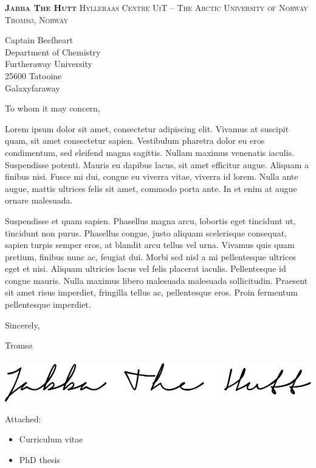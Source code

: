 \documentclass[11pt,a4paper,]{article}
\begin{document}
\footnotesize
\textsc{\textbf{Jabba The Hutt}}
\textbullet{} \textsc{Hylleraas Centre}
\textbullet{} \textsc{UiT -- The Arctic University of Norway}
\textbullet{} \textsc{Tromsø, Norway}

\vspace{5em}

\normalsize \sffamily
Captain Beefheart\\
Department of Chemistry\\
Furtheraway University\\
25600 Tatooine\\
Galaxyfaraway\\

\vspace{2em}

\rmfamily


\vspace{1em}

To whom it may concern,

Lorem ipsum dolor sit amet, consectetur adipiscing elit. Vivamus at
suscipit quam, sit amet consectetur sapien. Vestibulum pharetra dolor eu
eros condimentum, sed eleifend magna sagittis. Nullam maximus venenatis
iaculis. Suspendisse potenti. Mauris eu dapibus lacus, sit amet
efficitur augue. Aliquam a finibus nisi. Fusce mi dui, congue eu viverra
vitae, viverra id lorem. Nulla ante augue, mattis ultrices felis sit
amet, commodo porta ante. In et enim at augue ornare malesuada.

Suspendisse et quam sapien. Phasellus magna arcu, lobortis eget
tincidunt ut, tincidunt non purus. Phasellus congue, justo aliquam
scelerisque consequat, sapien turpis semper eros, at blandit arcu tellus
vel urna. Vivamus quis quam pretium, finibus nunc ac, feugiat dui. Morbi
sed nisl a mi pellentesque ultrices eget et nisi. Aliquam ultricies
lacus vel felis placerat iaculis. Pellentesque id congue mauris. Nulla
maximus libero malesuada malesuada sollicitudin. Praesent sit amet risus
imperdiet, fringilla tellus ac, pellentesque eros. Proin fermentum
pellentesque imperdiet.

Sincerely,

\begin{FlushRight}
  Tromsø \\
   \\
    \includegraphics[width=.5\textwidth]{signature.png} \par
  \end{FlushRight}

\color{Gray}
\small \sffamily
Attached:
\footnotesize \itshape
\begin{itemize}
  \item Curriculum vitae
  \item PhD thesis
  \end{itemize}
\end{document}
